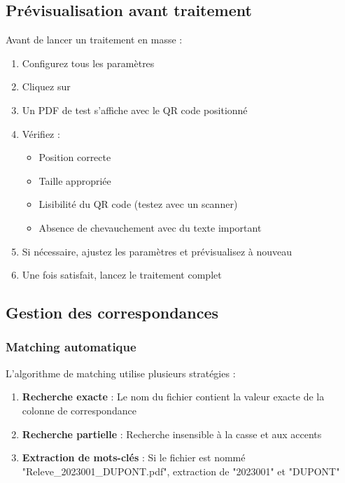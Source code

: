 \subsection{Prévisualisation avant traitement}

Avant de lancer un traitement en masse :

\begin{enumerate}[leftmargin=*]
    \item Configurez tous les paramètres
    \item Cliquez sur 
    \item Un PDF de test s'affiche avec le QR code positionné
    \item Vérifiez :
    \begin{itemize}
        \item Position correcte
        \item Taille appropriée
        \item Lisibilité du QR code (testez avec un scanner)
        \item Absence de chevauchement avec du texte important
    \end{itemize}
    \item Si nécessaire, ajustez les paramètres et prévisualisez à nouveau
    \item Une fois satisfait, lancez le traitement complet
\end{enumerate}

\subsection{Gestion des correspondances}

\subsubsection{Matching automatique}

L'algorithme de matching utilise plusieurs stratégies :

\begin{enumerate}[leftmargin=*]
    \item \textbf{Recherche exacte} : Le nom du fichier contient la valeur exacte de la colonne de correspondance
    \item \textbf{Recherche partielle} : Recherche insensible à la casse et aux accents
    \item \textbf{Extraction de mots-clés} : Si le fichier est nommé "Releve\_2023001\_DUPONT.pdf", extraction de "2023001" et "DUPONT"
\end{enumerate}

